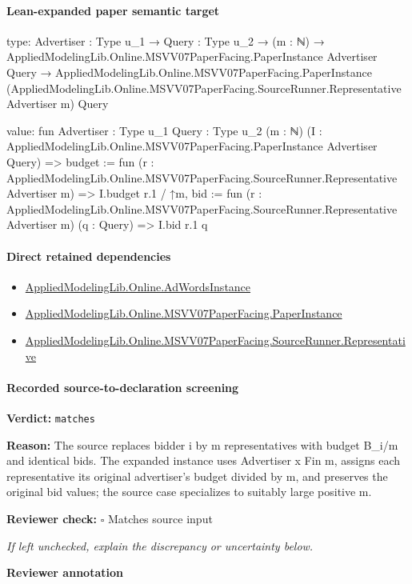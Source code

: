\documentclass[10pt]{article}
\newcommand{\reviewerbox}{%
  \par\noindent\fbox{\parbox{0.96\linewidth}{\rule{0pt}{0.38in}}}\par
}
\newcommand{\reviewmatch}[1]{%
  \par\noindent\textbf{Reviewer check:} $\square$\; #1\par
  \noindent\emph{If left unchecked, explain the discrepancy or uncertainty below.}\par
}
\begin{document}
\paragraph{Lean-expanded paper semantic target}
\begin{ReviewVerbatim}
type:
{Advertiser : Type u_1} →
  {Query : Type u_2} →
    (m : ℕ) →
      AppliedModelingLib.Online.MSVV07PaperFacing.PaperInstance Advertiser Query →
        AppliedModelingLib.Online.MSVV07PaperFacing.PaperInstance
          (AppliedModelingLib.Online.MSVV07PaperFacing.SourceRunner.Representative Advertiser m) Query

value:
fun {Advertiser : Type u_1} {Query : Type u_2} (m : ℕ)
    (I : AppliedModelingLib.Online.MSVV07PaperFacing.PaperInstance Advertiser Query) =>
  {
    budget := fun (r : AppliedModelingLib.Online.MSVV07PaperFacing.SourceRunner.Representative Advertiser m) =>
      I.budget r.1 / ↑m,
    bid := fun (r : AppliedModelingLib.Online.MSVV07PaperFacing.SourceRunner.Representative Advertiser m) (q : Query) =>
      I.bid r.1 q }
\end{ReviewVerbatim}

\paragraph{Direct retained dependencies}
\begin{itemize}\raggedright
\item \hyperlink{governing-declaration-e5ce49672bf26ab1}{Applied\allowbreak{}Modeling\allowbreak{}Lib.\allowbreak{}Online.\allowbreak{}Ad\allowbreak{}Words\allowbreak{}Instance}
\item \hyperlink{governing-declaration-11907576ec71eeb5}{Applied\allowbreak{}Modeling\allowbreak{}Lib.\allowbreak{}Online.\allowbreak{}MSVV07\allowbreak{}Paper\allowbreak{}Facing.\allowbreak{}Paper\allowbreak{}Instance}
\item \hyperlink{governing-declaration-49a2a5677e1a3800}{Applied\allowbreak{}Modeling\allowbreak{}Lib.\allowbreak{}Online.\allowbreak{}MSVV07\allowbreak{}Paper\allowbreak{}Facing.\allowbreak{}Source\allowbreak{}Runner.\allowbreak{}Representative}
\end{itemize}
\paragraph{Recorded source-to-declaration screening}
\textbf{Verdict:} \texttt{matches}
\\
{\raggedright
\textbf{Reason:} The source replaces bidder i by m representatives with budget B\_\allowbreak{}i/\allowbreak{}m and identical bids.\allowbreak{} The expanded instance uses Advertiser x Fin m, assigns each representative its original advertiser's budget divided by m, and preserves the original bid values;\allowbreak{} the source case specializes to suitably large positive m.\allowbreak{}
\par}
\reviewmatch{Matches source input}
\noindent\textbf{Reviewer annotation}\par
\reviewerbox
\clearpage
\hypertarget{paper-prerequisite-69f192f34b65f8c5}{}
\end{document}
